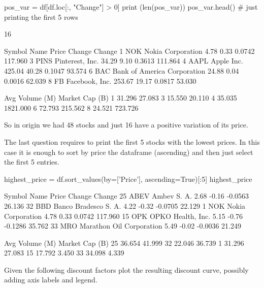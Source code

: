 \begin{ipython}
pos_var = df[df.loc[:, "Change"] > 0]
print (len(pos_var))
pos_var.head() # just printing the first 5 rows

16

  Symbol                         Name   Price  Change  Change%
1    NOK            Nokia Corporation    4.78    0.33   0.0742     117.960
3   PINS              Pinterest, Inc.   34.29    9.10   0.3613     111.864
4   AAPL                   Apple Inc.  425.04   40.28   0.1047      93.574
6    BAC  Bank of America Corporation   24.88    0.04   0.0016      62.039
8     FB               Facebook, Inc.  253.67   19.17   0.0817      53.030

   Avg Volume (M)  Market Cap (B)
1          31.296          27.083
3          15.550          20.110
4          35.035        1821.000
6          72.793         215.562
8          24.521         723.726
\end{ipython}
        
So in origin we had 48 stocks and just 16 have a positive variation of its price.

The last question requires to print the first 5 stocks with the lowest prices. In this case it is enough to sort by price the dataframe (ascending) and then just select the first 5 entries.

\begin{ipython}
highest_price = df.sort_values(by=['Price'], ascending=True)[:5]
highest_price

   Symbol                      Name  Price  Change  Change%
25   ABEV               Ambev S. A.   2.68   -0.16  -0.0563      26.136
32    BBD      Banco Bradesco S. A.   4.22   -0.32  -0.0705      22.129
1     NOK         Nokia Corporation   4.78    0.33   0.0742     117.960
15    OPK         OPKO Health, Inc.   5.15   -0.76  -0.1286      35.762
33    MRO  Marathon Oil Corporation   5.49   -0.02  -0.0036      21.249

    Avg Volume (M)  Market Cap (B)
25          36.654          41.999
32          22.046          36.739
1           31.296          27.083
15          17.792           3.450
33          34.098           4.339
\end{ipython}


\begin{question}
Given the following discount factors plot the resulting discount curve,
possibly adding axis labels and legend.
\end{question}

